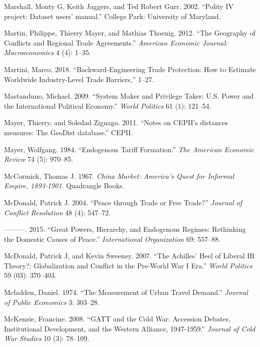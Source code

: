 \documentclass{puthesis}
\newlength{\cslhangindent}
\newenvironment{cslreferences}%
  {\setlength{\parindent}{0pt}%
  \everypar{\setlength{\hangindent}{\cslhangindent}}\ignorespaces}%
  {\par}
\begin{document}
\begin{cslreferences}
\leavevmode\hypertarget{ref-Marshall2002}{}%
Marshall, Monty G, Keith Jaggers, and Ted Robert Gurr. 2002. ``Polity IV
project: Dataset users' manual.'' College Park: University of Maryland.

\leavevmode\hypertarget{ref-Martin2012}{}%
Martin, Philippe, Thierry Mayer, and Mathias Thoenig. 2012. ``The
Geography of Conflicts and Regional Trade Agreements.'' \emph{American
Economic Journal: Macroeconomics} 4 (4): 1--35.

\leavevmode\hypertarget{ref-Martini2018}{}%
Martini, Marco. 2018. ``Backward-Engineering Trade Protection: How to
Estimate Worldwide Industry-Level Trade Barriers,'' 1--27.

\leavevmode\hypertarget{ref-Mastanduno2009}{}%
Mastanduno, Michael. 2009. ``System Maker and Privilege Taker: U.S.
Power and the International Political Economy.'' \emph{World Politics}
61 (1): 121--54.

\leavevmode\hypertarget{ref-Mayer2011}{}%
Mayer, Thierry, and Soledad Zignago. 2011. ``Notes on CEPII's distances
measures: The GeoDist database.'' CEPII.

\leavevmode\hypertarget{ref-Mayer1984}{}%
Mayer, Wolfgang. 1984. ``Endogenous Tariff Formation.'' \emph{The
American Economic Review} 74 (5): 970--85.

\leavevmode\hypertarget{ref-McCormick1967}{}%
McCormick, Thomas J. 1967. \emph{China Market: America's Quest for
Informal Empire, 1893-1901}. Quadrangle Books.

\leavevmode\hypertarget{ref-Mcdonald2004}{}%
McDonald, Patrick J. 2004. ``Peace through Trade or Free Trade?''
\emph{Journal of Conflict Resolution} 48 (4): 547--72.

\leavevmode\hypertarget{ref-Mcdonald2015}{}%
---------. 2015. ``Great Powers, Hierarchy, and Endogenous Regimes:
Rethinking the Domestic Causes of Peace.'' \emph{International
Organization} 69: 557--88.

\leavevmode\hypertarget{ref-Mcdonald2007}{}%
McDonald, Patrick J, and Kevin Sweeney. 2007. ``The Achilles' Heel of
Liberal IR Theory?: Globalization and Conflict in the Pre-World War I
Era.'' \emph{World Politics} 59 (03): 370--403.

\leavevmode\hypertarget{ref-Mcfadden1974}{}%
Mcfadden, Daniel. 1974. ``The Measurement of Urban Travel Demand.''
\emph{Journal of Public Economics} 3: 303--28.

\leavevmode\hypertarget{ref-McKenzie2008}{}%
McKenzie, Francine. 2008. ``GATT and the Cold War: Accession Debates,
Institutional Development, and the Western Alliance, 1947-1959.''
\emph{Journal of Cold War Studies} 10 (3): 78--109.


\end{cslreferences}
\end{document}
